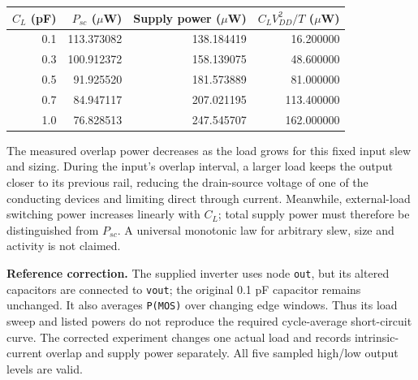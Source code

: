 \documentclass[11pt,a4paper]{article}
\begin{document}
\begin{center}\begin{tabular}{rrrr}\toprule
$C_L$ (pF)&$P_{sc}$ ($\mu$W)&Supply power ($\mu$W)&$C_LV_{DD}^2/T$ ($\mu$W)\\\midrule
0.1&113.373082&138.184419&16.200000\\
0.3&100.912372&158.139075&48.600000\\
0.5&91.925520&181.573889&81.000000\\
0.7&84.947117&207.021195&113.400000\\
1.0&76.828513&247.545707&162.000000\\
\bottomrule\end{tabular}\end{center}
\begin{center}\end{center}
The measured overlap power decreases as the load grows for this fixed input
slew and sizing. During the input's overlap interval, a larger load keeps the
output closer to its previous rail, reducing the drain-source voltage of one
of the conducting devices and limiting direct through current. Meanwhile,
external-load switching power increases linearly with $C_L$; total supply
power must therefore be distinguished from $P_{sc}$. A universal monotonic
law for arbitrary slew, size and activity is not claimed.

\textbf{Reference correction.} The supplied inverter uses node \texttt{out},
but its altered capacitors are connected to \texttt{vout}; the original
0.1 pF capacitor remains unchanged. It also averages \texttt{P(MOS)} over
changing edge windows. Thus its load sweep and listed powers do not reproduce
the required cycle-average short-circuit curve. The corrected experiment
changes one actual load and records intrinsic-current overlap and supply
power separately. All five sampled high/low output levels are valid.
\end{document}
